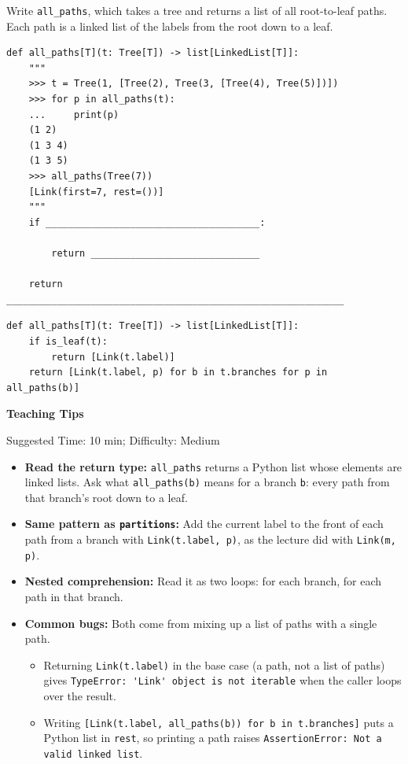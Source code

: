 \begin{blocksection}
\question Write \lstinline{all_paths}, which takes a tree and returns a list of all root-to-leaf paths. Each path is a linked list of the labels from the root down to a leaf.

\begin{lstlisting}
def all_paths[T](t: Tree[T]) -> list[LinkedList[T]]:
    """
    >>> t = Tree(1, [Tree(2), Tree(3, [Tree(4), Tree(5)])])
    >>> for p in all_paths(t):
    ...     print(p)
    (1 2)
    (1 3 4)
    (1 3 5)
    >>> all_paths(Tree(7))
    [Link(first=7, rest=())]
    """
    if ______________________________________:

        return ______________________________

    return ____________________________________________________________

\end{lstlisting}
\begin{solution}[1in]
\begin{lstlisting}
def all_paths[T](t: Tree[T]) -> list[LinkedList[T]]:
    if is_leaf(t):
        return [Link(t.label)]
    return [Link(t.label, p) for b in t.branches for p in all_paths(b)]
\end{lstlisting}
\end{solution}
\end{blocksection}

\begin{questionmeta}
\textbf{Teaching Tips}\par\nopagebreak[4]
Suggested Time: 10 min; Difficulty: Medium
\nopagebreak[4]
\begin{itemize}
    \item \textbf{Read the return type:} \lstinline{all_paths} returns a Python list whose elements are linked lists. Ask what \lstinline{all_paths(b)} means for a branch \lstinline{b}: every path from that branch's root down to a leaf.
    \item \textbf{Same pattern as \lstinline{partitions}:} Add the current label to the front of each path from a branch with \lstinline{Link(t.label, p)}, as the lecture did with \lstinline{Link(m, p)}.
    \item \textbf{Nested comprehension:} Read it as two loops: for each branch, for each path in that branch.
    \item \textbf{Common bugs:} Both come from mixing up a list of paths with a single path.
    \begin{itemize}
        \item Returning \lstinline{Link(t.label)} in the base case (a path, not a list of paths) gives \lstinline{TypeError: 'Link' object is not iterable} when the caller loops over the result.
        \item Writing \lstinline{[Link(t.label, all_paths(b)) for b in t.branches]} puts a Python list in \lstinline{rest}, so printing a path raises \lstinline{AssertionError: Not a valid linked list}.
    \end{itemize}
\end{itemize}
\end{questionmeta}
